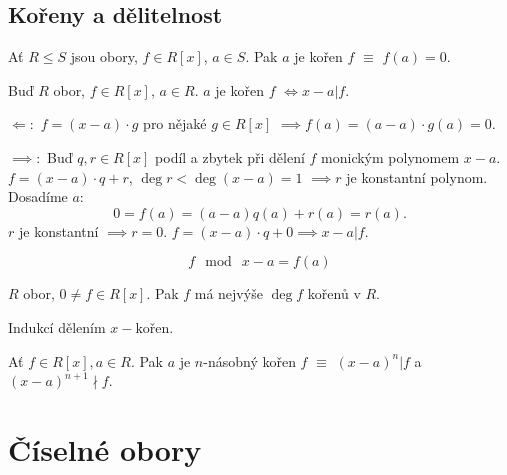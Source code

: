 \documentclass[12pt]{article}                   %
\begin{document}
    \subsection{Kořeny a dělitelnost}
        \begin{definice}
            Ať $R ≤ S$ jsou obory, $f \in R[x]$, $a \in S$. Pak $a$ je kořen $f$ $≡$ $f(a) = 0$.
        \end{definice}

        \begin{tvrzeni}
            Buď $R$ obor, $f \in R[x]$, $a \in R$. $a$ je kořen $f$ $\Leftrightarrow x-a | f$.

            \begin{dukazin}
                $\Leftarrow :$ $f = (x-a)·g$ pro nějaké $g \in R[x]$ $\implies f(a) = (a - a)·g(a) = 0$.
            
                $\implies:$ Buď $q, r \in R[x]$ podíl a zbytek při dělení $f$ monickým polynomem $x - a$. $f = (x - a)·q + r$, $\deg r < \deg (x - a) = 1$ $\implies r$ je konstantní polynom. Dosadíme $a$:
                $$ 0 = f(a) = (a-a)q(a) + r(a) = r(a). $$ 
                $r$ je konstantní $\implies r = 0$. $f = (x - a)·q + 0 \implies x - a | f$.
            \end{dukazin}
        \end{tvrzeni}

        \begin{pozorovani}
            $$ f \mod\ x-a = f(a) $$ 
        \end{pozorovani}

        \begin{veta}
            $R$ obor, $0 ≠ f \in R[x]$.  Pak $f$ má nejvýše $\deg f$ kořenů v $R$.

            \begin{dukazin}
                Indukcí dělením $x - \text{kořen}$.
            \end{dukazin}
        \end{veta}

        \begin{definice}
            Ať $f \in R[x], a \in R$. Pak $a$ je $n$-násobný kořen $f$ $≡$ $(x - a)^n | f$ a $(x - a)^{n + 1} \nmid f$.
        \end{definice}

\section{Číselné obory}
\end{document}
